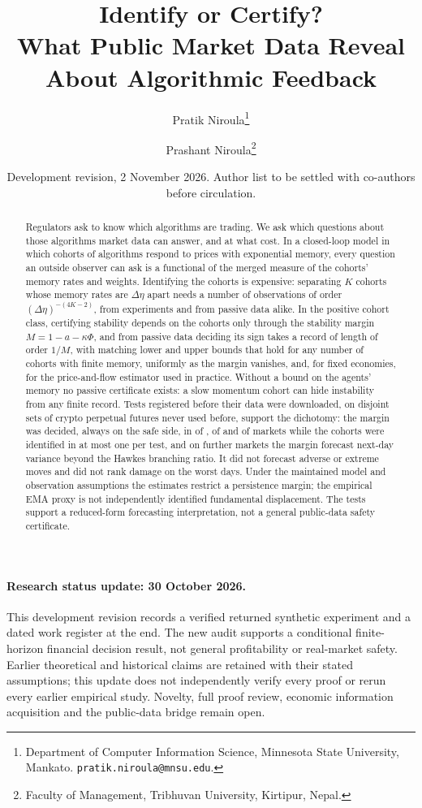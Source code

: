 \documentclass[12pt]{article}
\title{Identify or Certify?\\ What Public Market Data Reveal About Algorithmic Feedback}
\author{Pratik Niroula\thanks{Department of Computer Information Science, Minnesota State University, Mankato. \texttt{pratik.niroula@mnsu.edu}.}
\and Prashant Niroula\thanks{Faculty of Management, Tribhuvan University, Kirtipur, Nepal.}}
\date{Development revision, 2 November 2026. Author list to be settled with co-authors before circulation.}
\theoremstyle{definition}
\theoremstyle{remark}
\begin{document}
\maketitle

\begin{abstract}
\noindent Regulators ask to know which algorithms are trading. We ask which questions about those algorithms market data can answer, and at what cost. In a closed-loop model in which cohorts of algorithms respond to prices with exponential memory, every question an outside observer can ask is a functional of the merged measure of the cohorts' memory rates and weights. Identifying the cohorts is expensive: separating $K$ cohorts whose memory rates are $\Delta\eta$ apart needs a number of observations of order $(\Delta\eta)^{-(4K-2)}$, from experiments and from passive data alike. In the positive cohort class, certifying stability depends on the cohorts only through the stability margin $M=1-a-\kappa\Phi$, and from passive data deciding its sign takes a record of length of order $1/M$, with matching lower and upper bounds that hold for any number of cohorts with finite memory, uniformly as the margin vanishes, and, for fixed economies, for the price-and-flow estimator used in practice. Without a bound on the agents' memory no passive certificate exists: a slow momentum cohort can hide instability from any finite record. Tests registered before their data were downloaded, on disjoint sets of crypto perpetual futures never used before, support the dichotomy: the margin was decided, always on the safe side, in \CtwoDecided{} of \CtwoSymbols{}, \CthreeDecided{} of \CthreeSymbols{} and \FoneDecided{} of \FoneSymbols{} markets while the cohorts were identified in at most one per test, and on \SoneSymbols{} further markets the margin forecast next-day variance beyond the Hawkes branching ratio. It did not forecast adverse or extreme moves and did not rank damage on the worst days. Under the maintained model and observation assumptions the estimates restrict a persistence margin; the empirical EMA proxy is not independently identified fundamental displacement. The tests support a reduced-form forecasting interpretation, not a general public-data safety certificate.
\end{abstract}

\paragraph{Research status update: 30 October 2026.}
This development revision records a verified returned synthetic experiment and
a dated work register at the end. The new audit supports a conditional
finite-horizon financial decision result, not general profitability or
real-market safety. Earlier theoretical and historical claims are retained
with their stated assumptions; this update does not independently verify every
proof or rerun every earlier empirical study. Novelty, full proof review,
economic information acquisition and the public-data bridge remain open.
\end{document}
